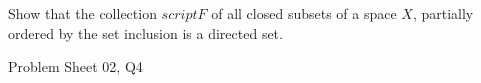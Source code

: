 \begin{samepage}
\begin{ex}
Show that the collection $script F$ of all closed subsets of a space $X$, partially ordered by the set inclusion is a directed set.
\end{ex}
\begin{source}
Problem Sheet 02, Q4
\end{source}
\end{samepage}
